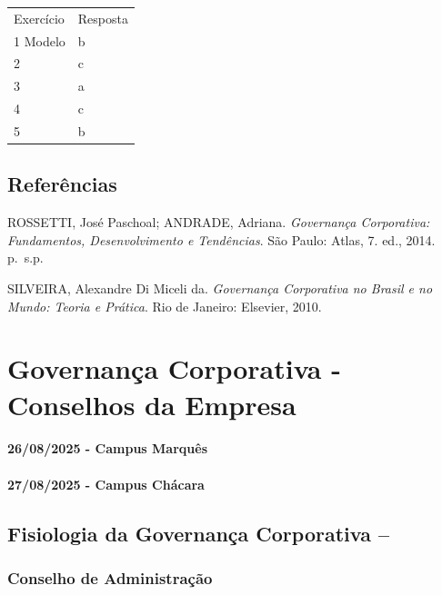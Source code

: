\documentclass[
]{book}
\begin{document}
\begin{longtable}[]{@{}ll@{}}
\toprule\noalign{}
\endhead
\bottomrule\noalign{}
\endlastfoot
Exercício & Resposta \\
1 Modelo & b \\
2 & c \\
3 & a \\
4 & c \\
5 & b \\
\end{longtable}

\section{Referências}\label{referuxeancias-1}

ROSSETTI, José Paschoal; ANDRADE, Adriana. \emph{Governança Corporativa: Fundamentos, Desenvolvimento e Tendências}. São Paulo: Atlas, 7. ed., 2014. p.~s.p.

SILVEIRA, Alexandre Di Miceli da. \emph{Governança Corporativa no Brasil e no Mundo: Teoria e Prática}. Rio de Janeiro: Elsevier, 2010.

\chapter{Governança Corporativa - Conselhos da Empresa}\label{governanuxe7a-corporativa---conselhos-da-empresa}

\subsubsection*{26/08/2025 - Campus Marquês}\label{campus-marquuxeas-3}

\subsubsection*{27/08/2025 - Campus Chácara}\label{campus-chuxe1cara-3}

\section{Fisiologia da Governança Corporativa --}\label{fisiologia-da-governanuxe7a-corporativa}

\subsection{Conselho de Administração}\label{conselho-de-administrauxe7uxe3o}
\end{document}
